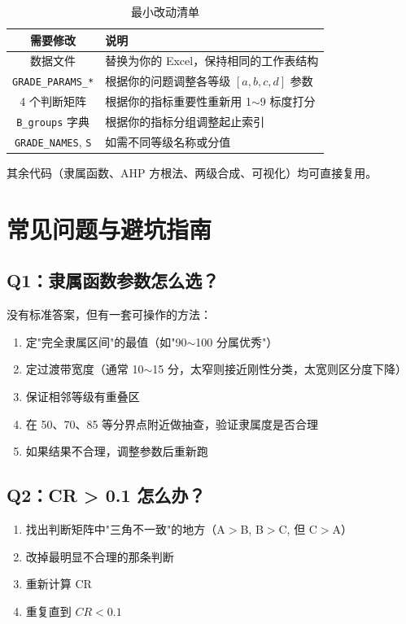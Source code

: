 \documentclass[a4paper,11pt]{ctexart}
\begin{document}
\begin{table}[H]
\centering
\caption{最小改动清单}
\begin{tabular}{cl}
\toprule
\textbf{需要修改} & \textbf{说明} \\
\midrule
数据文件 & 替换为你的 Excel，保持相同的工作表结构 \\
\texttt{GRADE\_PARAMS\_*} & 根据你的问题调整各等级 $[a,b,c,d]$ 参数 \\
4 个判断矩阵 & 根据你的指标重要性重新用 1$\sim$9 标度打分 \\
\texttt{B\_groups} 字典 & 根据你的指标分组调整起止索引 \\
\texttt{GRADE\_NAMES}, \texttt{S} & 如需不同等级名称或分值 \\
\bottomrule
\end{tabular}
\end{table}

其余代码（隶属函数、AHP 方根法、两级合成、可视化）均可直接复用。

\section{常见问题与避坑指南}

\subsection{Q1：隶属函数参数怎么选？}

没有标准答案，但有一套可操作的方法：
\begin{enumerate}
    \item 定"完全隶属区间"的最值（如"90$\sim$100 分属优秀"）
    \item 定过渡带宽度（通常 10$\sim$15 分，太窄则接近刚性分类，太宽则区分度下降）
    \item 保证相邻等级有重叠区
    \item 在 50、70、85 等分界点附近做抽查，验证隶属度是否合理
    \item 如果结果不合理，调整参数后重新跑
\end{enumerate}

\subsection{Q2：CR > 0.1 怎么办？}

\begin{enumerate}
    \item 找出判断矩阵中"三角不一致"的地方（A$>$B, B$>$C, 但 C$>$A）
    \item 改掉最明显不合理的那条判断
    \item 重新计算 CR
    \item 重复直到 $CR < 0.1$
\end{enumerate}
\end{document}
